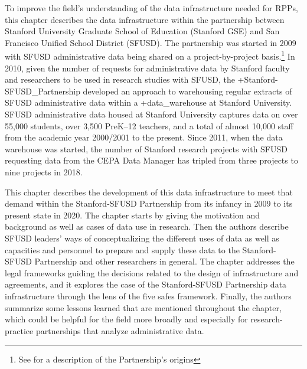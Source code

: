 \documentclass[
]{book}
\begin{document}
To improve the field's understanding of the data infrastructure needed for RPPs, this chapter describes the data infrastructure within the partnership between Stanford University Graduate School of Education (Stanford GSE) and San Francisco Unified School District (SFUSD). The partnership was started in 2009 with SFUSD administrative data being shared on a project-by-project basis.\footnote{See \citet{wentworth2016} for a description of the Partnership's origins} In 2010, given the number of requests for administrative data by Stanford faculty and researchers to be used in research studies with SFUSD, the +Stanford-SFUSD\_Partnership\textbar{} developed an approach to warehousing regular extracts of SFUSD administrative data within a +data\_warehouse\textbar{} at Stanford University. SFUSD administrative data housed at Stanford University captures data on over 55,000 students, over 3,500 PreK--12 teachers, and a total of almost 10,000 staff from the academic year 2000/2001 to the present. Since 2011, when the data warehouse was started, the number of Stanford research projects with SFUSD requesting data from the CEPA Data Manager has tripled from three projects to nine projects in 2018.

This chapter describes the development of this data infrastructure to meet that demand within the Stanford-SFUSD Partnership from its infancy in 2009 to its present state in 2020. The chapter starts by giving the motivation and background as well as cases of data use in research. Then the authors describe SFUSD leaders' ways of conceptualizing the different uses of data as well as capacities and personnel to prepare and supply these data to the Stanford-SFUSD Partnership and other researchers in general. The chapter addresses the legal frameworks guiding the decisions related to the design of infrastructure and agreements, and it explores the case of the Stanford-SFUSD Partnership data infrastructure through the lens of the five safes framework. Finally, the authors summarize some lessons learned that are mentioned throughout the chapter, which could be helpful for the field more broadly and especially for research-practice partnerships that analyze administrative data.
\end{document}
